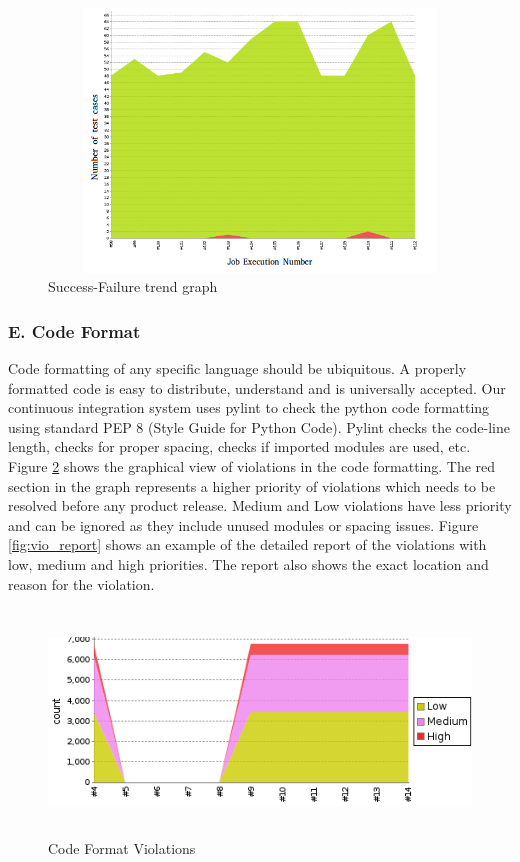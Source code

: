 \documentclass[10pt]{ruthesis}
\begin{document}
\label{}
\begin{figure}
 \begin{center}
  \includegraphics[width=15cm,height=7cm]{trends.png}
  \caption{Success-Failure trend graph}
  \label{fig:trend}
  \end{center}
\end{figure}

\subsubsection{\textbf{E. Code Format}}
Code formatting of any specific language should be ubiquitous. A properly formatted code is easy to distribute, understand and is universally accepted. Our continuous integration system uses pylint to check the python code formatting using standard PEP 8 (Style Guide for Python Code). Pylint checks the code-line length, checks for proper spacing, checks if imported modules are used, etc. Figure \ref{fig:violation} shows the graphical view of violations in the code formatting. The red section in the graph represents a higher priority of violations which needs to be resolved before any product release. Medium and Low violations have less priority and can be ignored as they include unused modules or spacing issues. Figure \ref{fig:vio_report} shows an example of the detailed report of the violations with low, medium and high priorities. The report also shows the exact location and reason for the violation.

\label{}
\begin{figure}
 \begin{center}
  \includegraphics[width=15cm,height=6cm]{violation.png}
  \caption{Code Format Violations}
  \label{fig:violation}
  \end{center}
\end{figure}
\end{document}
